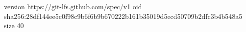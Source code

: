 version https://git-lfs.github.com/spec/v1
oid sha256:28df144ee5c0f98c9b6f6b9b670222b161b35019d5ecd50709b2dfc3b4b548a5
size 40
